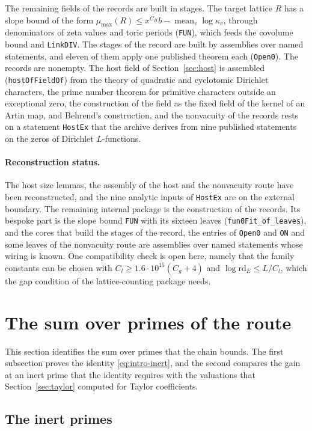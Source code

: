 \documentclass[11pt,letterpaper]{article}
\numberwithin{equation}{section}
\begin{document}
The remaining fields of the records are built in stages. The target lattice $R$ has a slope bound of the form $\mu_{\max}(R)\le x^{C_H}b-\operatorname{mean}_v\log\kappa_v$, through denominators of zeta values and toric periods (\texttt{FUN}), which feeds the covolume bound and \texttt{LinkDIV}. The stages of the record are built by assemblies over named statements, and eleven of them apply one published theorem each (\texttt{Open0}). The records are nonempty. The host field of Section~\ref{sec:host} is assembled (\texttt{hostOfFieldOf}) from the theory of quadratic and cyclotomic Dirichlet characters, the prime number theorem for primitive characters outside an exceptional zero, the construction of the field as the fixed field of the kernel of an Artin map, and Behrend's construction, and the nonvacuity of the records rests on a statement \texttt{HostEx} that the archive derives from nine published statements on the zeros of Dirichlet $L$-functions.

\paragraph{Reconstruction status.} The host size lemmas, the assembly of the host and the nonvacuity route have been reconstructed, and the nine analytic inputs of \texttt{HostEx} are on the external boundary. The remaining internal package is the construction of the records. Its bespoke part is the slope bound \texttt{FUN} with its sixteen leaves (\texttt{fun0Fit\_of\_leaves}), and the cores that build the stages of the record, the entries of \texttt{Open0} and \texttt{ON} and some leaves of the nonvacuity route are assemblies over named statements whose wiring is known. One compatibility check is open here, namely that the family constants can be chosen with $C_l\ge1.6\cdot10^{15}(C_g+4)$ and $\log\mathrm{rd}_E\le L/C_l$, which the gap condition of the lattice-counting package needs.

\section{The sum over primes of the route}\label{sec:ps}

This section identifies the sum over primes that the chain bounds. The first subsection proves the identity \eqref{eq:intro-inert}, and the second compares the gain at an inert prime that the identity requires with the valuations that Section~\ref{sec:taylor} computed for Taylor coefficients.

\subsection{The inert primes}\label{sec:primesum}
\end{document}

